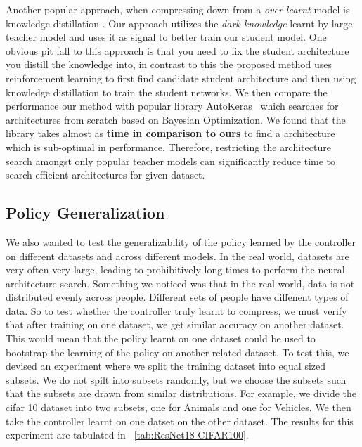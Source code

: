 \documentclass[../main]{subfiles}
\begin{document}
        Another popular approach, when compressing down from a \textit{over-learnt} model is knowledge distillation \cite{hinton2015distilling}.
        Our approach utilizes the \textit{dark knowledge} learnt by large teacher model and uses it as signal to better train our student model.
        One obvious pit fall to this approach is that you need to fix the student architecture you distill the knowledge into, in contrast to this the proposed method uses reinforcement learning to first find candidate student architecture and then using knowledge distillation to train the student networks.
        We then compare the performance our method with popular library AutoKeras~\cite{jin2018efficient} which searches for architectures from scratch based on Bayesian Optimization.
        We found that the library takes almost as \textbf{time in comparison to ours} to find a architecture which is sub-optimal in performance.
        Therefore, restricting the architecture search amongst only popular teacher models can significantly reduce time to search efficient architectures for given dataset.
    
    
    \subsection{Policy Generalization}
        \label{sec:pg}
        We also wanted to test the generalizability of the policy learned by the controller on different datasets and across different models.
        In the real world, datasets are very often very large, leading to prohibitively long times to perform the neural architecture search.
        Something we noticed was that in the real world, data is not distributed evenly across people.
        Different sets of people have diffenent types of data.
        So to test whether the controller truly learnt to compress, we must verify that after training on one dataset, we get similar accuracy on another dataset.
        This would mean that the policy learnt on one dataset could be used to bootstrap the learning of the policy on another related dataset.
        To test this, we devised an experiment where we split the training dataset into equal sized subsets.
        We do not spilt into subsets randomly, but we choose the subsets such that the subsets are drawn from similar distributions.
        For example, we divide the cifar 10 dataset into two subsets, one for Animals and one for Vehicles.
        We then take the controller learnt on one datset on the other dataset. The results for this experiment are tabulated in \tablename~\ref{tab:ResNet18-CIFAR100}.
\end{document}
